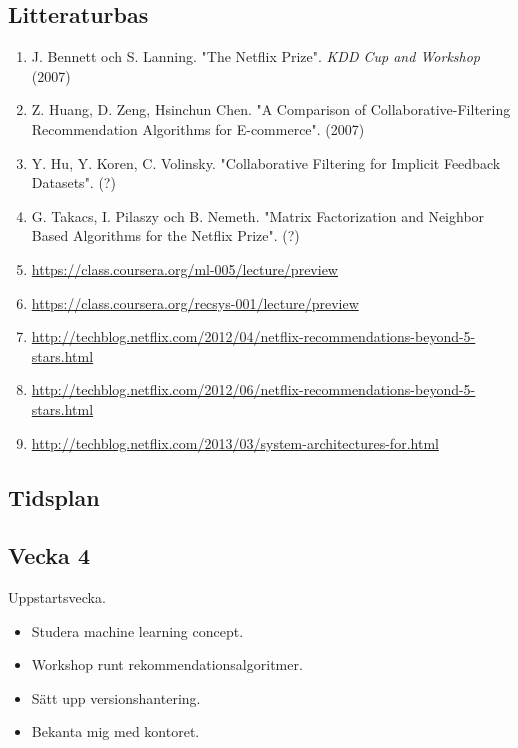 \documentclass[11pt]{article}
\begin{document}
\newpage


\subsection*{Litteraturbas}

\begin{enumerate}

    \item J. Bennett och S. Lanning. "The Netflix Prize". \textit{KDD Cup and Workshop} (2007)

    \item Z. Huang, D. Zeng, Hsinchun Chen. "A Comparison of Collaborative-Filtering Recommendation Algorithms for E-commerce". (2007)

    \item Y. Hu, Y. Koren, C.  Volinsky. "Collaborative Filtering for Implicit Feedback Datasets". (?)

    \item G. Takacs, I. Pilaszy och B. Nemeth. "Matrix Factorization and Neighbor Based Algorithms for the Netflix Prize". (?)

    \item \url{https://class.coursera.org/ml-005/lecture/preview}
    \item \url{https://class.coursera.org/recsys-001/lecture/preview}

    \item \url{http://techblog.netflix.com/2012/04/netflix-recommendations-beyond-5-stars.html}
    \item \url{http://techblog.netflix.com/2012/06/netflix-recommendations-beyond-5-stars.html}
    \item \url{http://techblog.netflix.com/2013/03/system-architectures-for.html}


\end{enumerate}

\newpage


\subsection*{Tidsplan}

\subsection*{Vecka 4}

Uppstartsvecka.

\begin{itemize}
    \item Studera machine learning concept.
    \item Workshop runt rekommendationsalgoritmer.
    \item Sätt upp versionshantering.
    \item Bekanta mig med kontoret.
\end{itemize}
\end{document}
